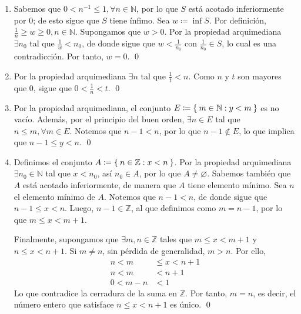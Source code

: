 \documentclass[11pt]{article}
\newcommand{\N}{\mathbb{N}}
\newcommand{\Z}{\mathbb{Z}}
\let\emptyset\varnothing
\let\set\Set
\begin{document}
\begin{enumerate}[label=\alph*)]
 \item Sabemos que $0<n^{-1}\leq 1, \forall n\in \N$, por lo que $S$ está acotado inferiormente por $0$; de esto sigue que $S$ tiene ínfimo. Sea $w\coloneqq \inf{S}$. Por definición, $\frac{1}{n}\geq w\geq 0, n\in \N$. Supongamos que $w>0$. Por la propiedad arquimediana $\exists n_0$ tal que $\frac{1}{w} < n_0$, de donde sigue que $w<\frac{1}{n_0}$ con $\frac{1}{n_0} \in S$, lo cual es una contradicción. Por tanto, $w=0$. \qed
 
 \item Por la propiedad arquimediana $\exists n$ tal que $\frac{1}{t}<n$. Como $n$ y $t$ son mayores que $0$, sigue que $0<\frac{1}{n}<t$. \qed
 
 \item Por la propiedad arquimediana, el conjunto $E\coloneqq \set{m\in \N: y<m}$ es no vacío. Además, por el principio del buen orden, $\exists n\in E$ tal que $n\leq m, \forall m\in E$. Notemos que $n-1<n$, por lo que $n-1\notin E$, lo que implica que $n-1\leq y<n$. \qed
 
 \item Definimos el conjunto $A\coloneqq \set{n\in \Z: x<n}$. Por la propiedad arquimediana $\exists n_0 \in \N$ tal que $x<n_0$, así $n_0\in A$, por lo que $A\neq \emptyset$. Sabemos también que $A$ está acotado inferiormente, de manera que $A$ tiene elemento mínimo. Sea $n$ el elemento mínimo de $A$. Notemos que $n-1<n$, de donde sigue que $n-1\leq x<n$. Luego, $n-1\in \Z$, al que definimos como $m=n-1$, por lo que $m\leq x<m+1$.
 
 Finalmente, supongamos que $\exists m, n\in \Z$ tales que $m\leq x<m+1$ y $n\leq x<n+1$. Si $m\neq n$, sin pérdida de generalidad, $m>n$. Por ello, \begin{align*}
  n < m &\leq x<n+1 \\
  n < m &<n+1 \\
  0 < m-n &<1
 \end{align*}  
 Lo que contradice la cerradura de la suma en $\Z$. Por tanto, $m=n$, es decir, el número entero que satisface $n\leq x<n+1$ es único. \qed
% 
%
\end{enumerate}
\end{document}
